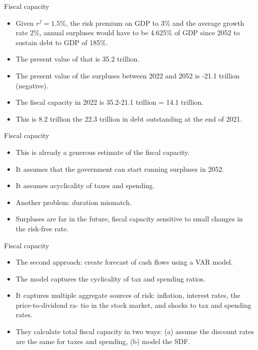 \documentclass[11pt,xcolor={dvipsnames},aspectratio=159,hyperref={pdftex,pdfpagemode=UseNone,hidelinks,pdfdisplaydoctitle=true},usepdftitle=false]{beamer}
\begin{document}
   \begin{frame}{Fiscal capacity}
    \begin{itemize}
        \item Given $r^f = 1.5\%$, the risk premium on GDP to 3\% and the average growth rate 2\%, annual surpluses would have to be 4.625\% of GDP since 2052 to sustain debt to GDP of 185\%.
        \item The present value of that is 35.2 trillion.
        \item The present value of the surpluses between 2022 and 2052 is -21.1 trillion (negative).
        \item The fiscal capacity in 2022 is 35.2-21.1 trillion = 14.1 trillion.
        \item This is 8.2 trillion  the 22.3 trillion in debt outstanding at the end of 2021.
    \end{itemize}
   \end{frame}  

   \begin{frame}{Fiscal capacity}
    \begin{itemize}
        \item This is already a generous estimate of the fiscal capacity.
        \item It assumes that the government can start running surpluses in 2052.
        \item It assumes acyclicality of taxes and spending.
        \item Another problem: duration mismatch.
        \item Surpluses are far in the future, fiscal capacity sensitive to small changes in the risk-free rate. 
    \end{itemize}
   \end{frame}    

   \begin{frame}{Fiscal capacity}
    \begin{itemize}
        \item The second approach: create forecast of cash flows using a VAR model.
        \item The model captures the cyclicality of tax and spending ratios.
        \item It captures multiple aggregate sources of risk:       inflation, interest rates, the price-to-dividend ra-
        tio in the stock market, and shocks to tax and spending rates.
        \item They calculate total fiscal capacity in two ways: (a) assume the discount rates are the same for taxes and spending, (b) model the SDF. 
    \end{itemize}
   \end{frame}  
\end{document}
